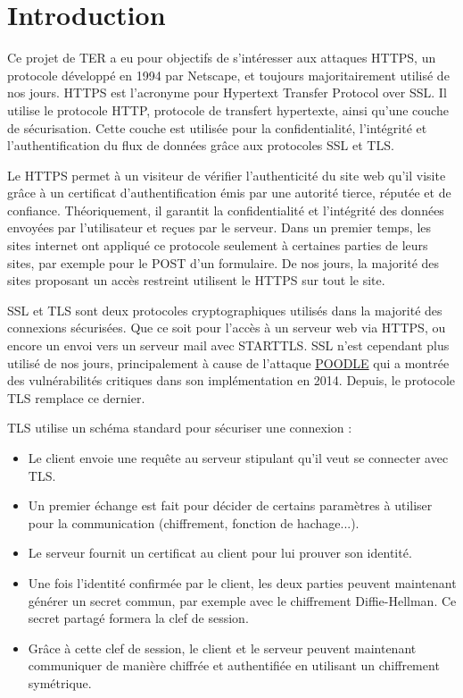 \chapter*{Introduction}

Ce projet de TER a eu pour objectifs de s'intéresser aux attaques HTTPS, un protocole développé en 1994 par Netscape, et toujours majoritairement utilisé de nos jours. HTTPS est l'acronyme pour Hypertext Transfer Protocol over SSL. Il utilise le protocole HTTP, protocole de transfert hypertexte, ainsi qu'une couche de sécurisation. Cette couche est utilisée pour la confidentialité, l'intégrité et l'authentification du flux de données grâce aux protocoles SSL et TLS.

Le HTTPS permet à un visiteur de vérifier l'authenticité du site web qu'il visite grâce à un certificat d'authentification émis par une autorité tierce, réputée et de confiance. Théoriquement, il garantit la confidentialité et l'intégrité des données envoyées par l'utilisateur et reçues par le serveur. Dans un premier temps, les sites internet ont appliqué ce protocole seulement à certaines parties de leurs sites, par exemple pour le POST d'un formulaire. De nos jours, la majorité des sites proposant un accès restreint utilisent le HTTPS sur tout le site.

SSL et TLS sont deux protocoles cryptographiques utilisés dans la majorité des connexions sécurisées. Que ce soit pour l'accès à un serveur web via HTTPS, ou encore un envoi vers un serveur mail avec STARTTLS. SSL n'est cependant plus utilisé de nos jours, principalement à cause de l'attaque \hyperref[sec:poodle]{POODLE} qui a montrée des vulnérabilités critiques dans son implémentation en 2014. Depuis, le protocole TLS remplace ce dernier.

TLS utilise un schéma standard pour sécuriser une connexion :

\begin{itemize}
    \item Le client envoie une requête au serveur stipulant qu'il veut se connecter avec TLS.
    \item Un premier échange est fait pour décider de certains paramètres à utiliser pour la communication (chiffrement, fonction de hachage...).
    \item Le serveur fournit un certificat au client pour lui prouver son identité.
    \item Une fois l'identité confirmée par le client, les deux parties peuvent maintenant générer un secret commun, par exemple avec le chiffrement Diffie-Hellman. Ce secret partagé formera la clef de session.
    \item Grâce à cette clef de session, le client et le serveur peuvent maintenant communiquer de manière chiffrée et authentifiée en utilisant un chiffrement symétrique.
\end{itemize}

